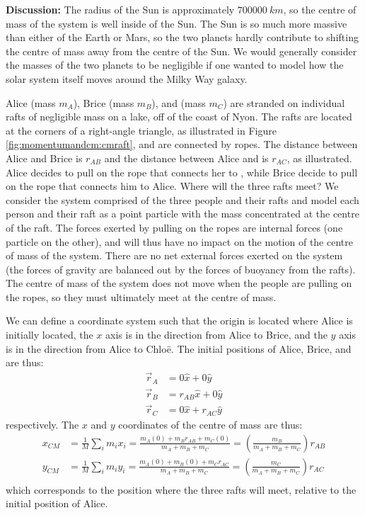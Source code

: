 \begin{example}
\textbf{Discussion:} The radius of the Sun is approximately $\SI{700000}{km}$, so the centre of mass of the system is well inside of the Sun. The Sun is so much more massive than either of the Earth or Mars, so the two planets hardly contribute to shifting the centre of mass away from the centre of the Sun. We would generally consider the masses of the two planets to be negligible if one wanted to model how the solar system itself moves around the Milky Way galaxy.
\end{example}

\begin{example}{
Alice (mass $m_A$), Brice (mass $m_B$), and \chloe (mass $m_C$) are stranded on individual rafts of negligible mass on a lake, off of the coast of Nyon. The rafts are located at the corners of a right-angle triangle, as illustrated in Figure \ref{fig:momentumandcm:cmraft}, and are connected by ropes. The distance between Alice and Brice is $r_{AB}$ and the distance between Alice and \chloe is $r_{AC}$, as illustrated. Alice decides to pull on the rope that connects her to \chloe, while Brice decide to pull on the rope that connects him to Alice. Where will the three rafts meet?}
We consider the system comprised of the three people and their rafts and model each person and their raft as a point particle with the mass concentrated at the centre of the raft. The forces exerted by pulling on the ropes are internal forces (one particle on the other), and will thus have no impact on the motion of the centre of mass of the system. There are no net external forces exerted on the system (the forces of gravity are balanced out by the forces of buoyancy from the rafts). The centre of mass of the system does not move when the people are pulling on the ropes, so they must ultimately meet at the centre of mass.

We can define a coordinate system such that the origin is located where Alice is initially located, the $x$ axis is in the direction from Alice to Brice, and the $y$ axis is in the direction from Alice to Chlo\"e. The initial positions of Alice, Brice, and \chloe are thus:
\begin{align*}
\vec r_A &= 0\hat x + 0\hat y\\
\vec r_B &= r_{AB}\hat x + 0\hat y\\
\vec r_C &= 0\hat x + r_{AC}\hat y
\end{align*}
respectively. The $x$ and $y$ coordinates of the centre of mass are thus:
\begin{align*}
x_{CM} &= \frac{1}{M}\sum_i m_i x_i = \frac{m_A(0) + m_Br_{AB} + m_C(0)}{m_A + m_B + m_C}=\left(\frac{m_B}{m_A + m_B + m_C}\right)r_{AB}\\
y_{CM} &= \frac{1}{M}\sum_i m_i y_i = \frac{m_A(0) + m_B(0) + m_Cr_{AC}}{m_A + m_B + m_C}=\left(\frac{m_C}{m_A + m_B + m_C}\right)r_{AC}\\
\end{align*}
which corresponds to the position where the three rafts will meet, relative to the initial position of Alice.


\end{example}
